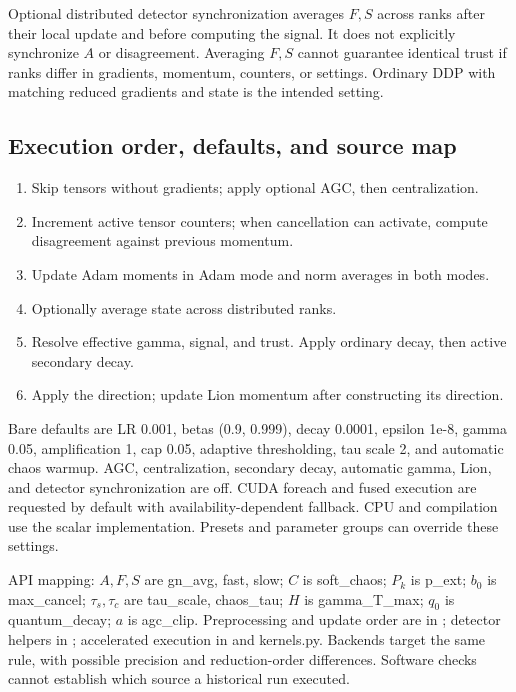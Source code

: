 \documentclass[11pt,a4paper]{article}
\begin{document}
Optional distributed detector synchronization averages $F,S$ across ranks after their local update and before computing the signal. It does not explicitly synchronize $A$ or disagreement. Averaging $F,S$ cannot guarantee identical trust if ranks differ in gradients, momentum, counters, or settings. Ordinary DDP with matching reduced gradients and state is the intended setting.

\subsection{Execution order, defaults, and source map}

\begin{enumerate}[itemsep=2pt]
\item Skip tensors without gradients; apply optional AGC, then centralization.
\item Increment active tensor counters; when cancellation can activate, compute disagreement against previous momentum.
\item Update Adam moments in Adam mode and norm averages in both modes.
\item Optionally average  state across distributed ranks.
\item Resolve effective gamma, signal, and trust. Apply ordinary decay, then active secondary decay.
\item Apply the direction; update Lion momentum after constructing its direction.
\end{enumerate}

Bare defaults are LR 0.001, betas (0.9, 0.999), decay 0.0001, epsilon 1e-8, gamma 0.05, amplification 1, cap 0.05, adaptive thresholding, tau scale 2, and automatic chaos warmup. AGC, centralization, secondary decay, automatic gamma, Lion, and detector synchronization are off. CUDA foreach and fused execution are requested by default with availability-dependent fallback. CPU and compilation use the scalar implementation. Presets and parameter groups can override these settings.

API mapping: $A,F,S$ are gn\_avg, fast, slow; $C$ is soft\_chaos; $P_k$ is p\_ext; $b_0$ is max\_cancel; $\tau_s,\tau_c$ are tau\_scale, chaos\_tau; $H$ is gamma\_T\_max; $q_0$ is quantum\_decay; $a$ is agc\_clip. Preprocessing and update order are in ; detector helpers in ; accelerated execution in  and kernels.py. Backends target the same rule, with possible precision and reduction-order differences. Software checks cannot establish which source a historical run executed.
\end{document}
